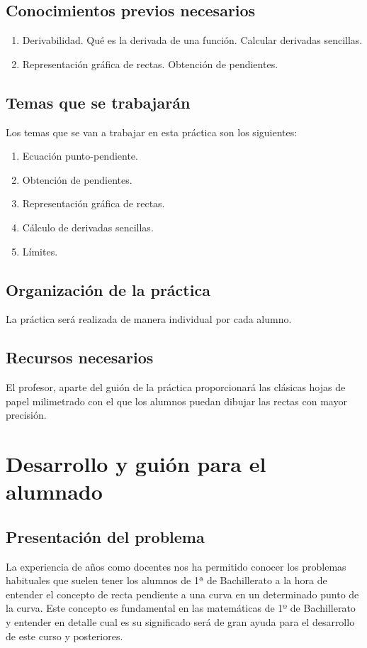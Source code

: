 \documentclass[palatino]{apuntesURJC}
\begin{document}
\subsection{Conocimientos previos necesarios}
\begin{enumerate}
	\item Derivabilidad. Qué es la derivada de una función. Calcular derivadas sencillas.
	\item Representación gráfica de rectas. Obtención de pendientes.
\end{enumerate}

\subsection{Temas que se trabajarán}
Los temas que se van a trabajar en esta práctica son los siguientes: 
\begin{enumerate}
	\item Ecuación punto-pendiente.
	\item Obtención de pendientes.
	\item Representación gráfica de rectas. 
	\item Cálculo de derivadas sencillas. 
	\item Límites.
\end{enumerate}

\subsection{Organización de la práctica}
La práctica será realizada de manera individual por cada alumno.

\subsection{Recursos necesarios}
El profesor, aparte del guión de la práctica proporcionará las clásicas hojas de papel milimetrado con el que los alumnos puedan dibujar las rectas con mayor precisión.
\newpage

\section{Desarrollo y guión para el alumnado}

\subsection{Presentación del problema}
La experiencia de años como docentes nos ha permitido conocer los problemas habituales que suelen tener los alumnos de 1ª de Bachillerato a la hora de entender el concepto de recta pendiente a una curva en un determinado punto de la curva. Este concepto es fundamental en las matemáticas de 1º de Bachillerato y entender en detalle cual es su significado será de gran ayuda para el desarrollo de este curso y posteriores.
\end{document}
